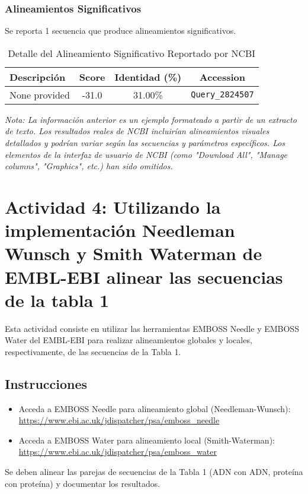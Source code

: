 \documentclass[fleqn,10pt]{article}
\begin{document}
\subsubsection*{Alineamientos Significativos}
Se reporta 1 secuencia que produce alineamientos significativos.

\begin{table}[htbp]
\centering
\caption{Detalle del Alineamiento Significativo Reportado por NCBI}
\label{tab:ncbi_significant_alignment_example}
\begin{tabular}{@{}lccc@{}}
\toprule
\textbf{Descripción} & \textbf{Score} & \textbf{Identidad (\%)} & \textbf{Accession} \\
\midrule
None provided        & -31.0          & 31.00\%                 & \texttt{Query\_2824507}       \\
\bottomrule
\end{tabular}
\end{table}

\textit{Nota: La información anterior es un ejemplo formateado a partir de un extracto de texto. Los resultados reales de NCBI incluirían alineamientos visuales detallados y podrían variar según las secuencias y parámetros específicos. Los elementos de la interfaz de usuario de NCBI (como "Download All", "Manage columns", "Graphics", etc.) han sido omitidos.}

\section{Actividad 4: Utilizando la implementación Needleman Wunsch y Smith Waterman de EMBL-EBI alinear las secuencias de la tabla 1}

Esta actividad consiste en utilizar las herramientas EMBOSS Needle y EMBOSS Water del EMBL-EBI para realizar alineamientos globales y locales, respectivamente, de las secuencias de la Tabla 1.

\subsection*{Instrucciones}
\begin{itemize}
    \item Acceda a EMBOSS Needle para alineamiento global (Needleman-Wunsch): \url{https://www.ebi.ac.uk/jdispatcher/psa/emboss_needle}
    \item Acceda a EMBOSS Water para alineamiento local (Smith-Waterman): \url{https://www.ebi.ac.uk/jdispatcher/psa/emboss_water}
\end{itemize}
Se deben alinear las parejas de secuencias de la Tabla 1 (ADN con ADN, proteína con proteína) y documentar los resultados.
\end{document}
